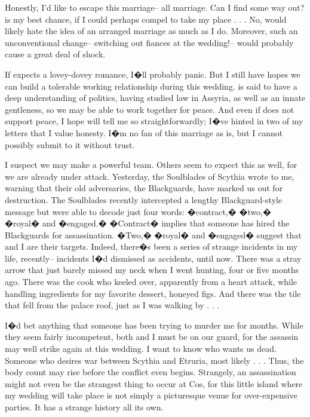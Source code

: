 \documentclass[char]{Kos}
\begin{document}
Honestly, I'd like to escape this marriage-- all marriage. Can I find some way out? \cPoet{\nickname} is my best chance, if I could perhaps compel \cPoet{\nickname} to take my place . . . No, \cPoet{\they} would likely hate the idea of an arranged marriage as much as I do. Moreover, such an unconventional change-- switching out fiances at the wedding!-- would probably cause a great deal of shock.

 If \cBride{\they} expects a lovey-dovey romance, I�ll probably panic. But I still have hopes we can build a tolerable working relationship during this wedding. \cBride{\They} is said to have a deep understanding of politics, having studied law in Assyria, as well as an innate gentleness, so we may be able to work together for peace. And even if \cBride{\they} does not support peace, I hope \cBride{\they} will tell me so straightforwardly; I�ve hinted in two of my letters that I value honesty. I�m no fan of this marriage as is, but I cannot possibly submit to it without trust.

I suspect we may make a powerful team. Others seem to expect this as well, for we are already under attack. Yesterday, the Soulblades of Scythia wrote to me, warning that their old adversaries, the Blackguards, have marked us out for destruction. The Soulblades recently intercepted a lengthy Blackguard-style message but were able to decode just four words: �contract,� �two,� �royal� and �engaged.� �Contract� implies that someone has hired the Blackguards for assassination. �Two,� �royal� and �engaged� suggest that \cBride{\they} and I are their targets. Indeed, there�s been a series of strange incidents in my life, recently-- incidents I�d dismissed as accidents, until now. There was a stray arrow that just barely missed my neck when I went hunting, four or five months ago. There was the cook who keeled over, apparently from a heart attack, while handling ingredients for my favorite dessert, honeyed figs. And there was the tile that fell from the palace roof, just as I was walking by . . . 

I�d bet anything that someone has been trying to murder me for months. While they seem fairly incompetent, both \cBride{\nickname} and I must be on our guard, for the assassin may well strike again at this wedding. I want to know who wants us dead. Someone who desires war between Scythia and Etruria, most likely . . . Thus, the body count may rise before the conflict even begins. Strangely, an assassination might not even be the strangest thing to occur at Cos, for this little island where my wedding will take place is not simply a picturesque venue for over-expensive parties. It has a strange history all its own.
\end{document}

